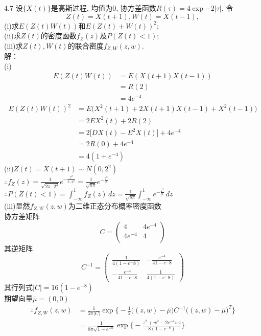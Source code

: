 4.7 设$\{X(t)\}$是高斯过程, 均值为$0$, 协方差函数$R(\tau) = 4\exp{-2|\tau|}$. 令
\[
Z(t) = X(t+1), W(t) = X(t-1),
\]
(i)求$E(Z(t)W(t))$和$E(Z(t) + W(t))^2$;\\
(ii)求$Z(t)$的密度函数$f_Z(z)$及$P(Z(t)<1)$;\\
(iii)求$Z(t), W(t)$的联合密度$f_{Z,W}(z,w)$.\\
解：\\
(i)
	\[
	\begin{split}
	E(Z(t)W(t)) & = E(X(t+1)X(t-1))\\
				& = R(2)\\
				& = 4e^{-4}
	\end{split}
	\]
	\[
	\begin{split}
	E(Z(t)W(t))^2 & = E\big(X^2(t+1)+2X(t+1)X(t-1)+X^2(t-1)\big)\\
				& = 2EX^2(t)+2R(2)\\
				& = 2\big[DX(t)-E^2X(t)\big] + 4e^{-4}\\
				& = 2R(0) + 4e^{-4}\\
				& = 4(1+e^{-4})
	\end{split}
	\]
	(ii)$Z(t) = X(t+1) \sim N(0, 2^2)$\\
	$\therefore f_Z(z) = \frac{1}{\sqrt{2\pi\cdot 2^2}}e^{-\frac{z^2}{2\cdot 2^2}} = \frac{1}{\sqrt{8\pi}}e^{-\frac{z^2}{8}}$\\
	$\therefore P(Z(t)<1) = \int^1_{-\infty}f_Z(z)\,dz = \frac{1}{\sqrt{8\pi}}\int^1_{-\infty}e^{-\frac{z^2}{8}}\,dz$\\
	(iii)显然$f_{Z,W}(z,w)$为二维正态分布概率密度函数\\
	协方差矩阵
	\[
	C=
	\begin{pmatrix}
	4 & 4e^{-4}\\
	4e^{-4} & 4\\
	\end{pmatrix}
	\]
	其逆矩阵
	\[
	C^{-1}=
	\begin{pmatrix}
	\frac{1}{4(1-e^-8)} & -\frac{e^{-4}}{4{1-e^-8}}\\
	-\frac{e^{-4}}{4{1-e^-8}} & \frac{1}{4(1-e^-8)}
	\end{pmatrix}
	\]
	其行列式$\left|C\right| = 16(1-e^{-8})$\\
	期望向量$\bar \mu = (0,0)$\\
	\[
	\begin{split}
	\therefore f_{Z,W}(z,w) & = \frac{1}{2\pi\left|C\right|}\exp\Bigg\{-\frac{1}{2}\Big((z,w)-\bar \mu\Big)C^{-1}\Big((z,w)-\bar \mu\Big)^T\Bigg\}\\
							& = \frac{1}{8\pi\sqrt{1-e^{-8}}}\exp\Bigg\{-\frac{z^2+w^2-2e^{-4}wz}{8(1-e^{-8})}\Bigg\}
	\end{split}
	\]


